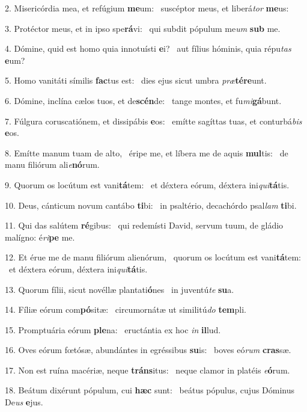 2. Misericórdia mea, et refúgium \textbf{me}um: \ast\  suscéptor meus, et liberá\textit{tor} \textbf{me}us:\

3. Protéctor meus, et in ipso spe\textbf{rá}vi: \ast\  qui subdit pópulum me\textit{um} \textbf{sub} me.\

4. Dómine, quid est homo quia innotuísti \textbf{e}i? \ast\  aut fílius hóminis, quia répu\textit{tas} \textbf{e}um?\

5. Homo vanitáti símilis \textbf{fac}tus est: \ast\  dies ejus sicut umbra \textit{præ}\textbf{tér}\textbf{e}unt.\

6. Dómine, inclína cælos tuos, et de\textbf{scén}de: \ast\  tange montes, et fu\textit{mi}\textbf{gá}bunt.\

7. Fúlgura coruscatiónem, et dissipábis \textbf{e}os: \ast\  emítte sagíttas tuas, et conturbá\textit{bis} \textbf{e}os.\

8. Emítte manum tuam de alto, \dag\  éripe me, et líbera me de aquis \textbf{mul}tis: \ast\  de manu filiórum ali\textit{e}\textbf{nó}rum.\

9. Quorum os locútum est vani\textbf{tá}tem: \ast\  et déxtera eórum, déxtera ini\textit{qui}\textbf{tá}tis.\

10. Deus, cánticum novum cantábo \textbf{ti}bi: \ast\  in psaltério, decachórdo psal\textit{lam} \textbf{ti}bi.\

11. Qui das salútem \textbf{ré}gibus: \ast\  qui redemísti David, servum tuum, de gládio malígno: é\textit{ri}\textbf{pe} me.\

12. Et érue me de manu filiórum alienórum, \dag\  quorum os locútum est vani\textbf{tá}tem: \ast\  et déxtera eórum, déxtera ini\textit{qui}\textbf{tá}tis.\

13. Quorum fílii, sicut novéllæ plantati\textbf{ó}nes \ast\  in juventú\textit{te} \textbf{su}a.\

14. Fíliæ eórum com\textbf{pó}sitæ: \ast\  circumornátæ ut similitú\textit{do} \textbf{tem}pli.\

15. Promptuária eórum \textbf{ple}na: \ast\  eructántia ex hoc \textit{in} \textbf{il}lud.\

16. Oves eórum fœtósæ, abundántes in egréssibus \textbf{su}is: \ast\  boves eó\textit{rum} \textbf{cras}sæ.\

17. Non est ruína macériæ, neque \textbf{tráns}itus: \ast\  neque clamor in platéis \textit{e}\textbf{ó}rum.\

18. Beátum dixérunt pópulum, cui \textbf{hæc} sunt: \ast\  beátus pópulus, cujus Dóminus De\textit{us} \textbf{e}jus.\

